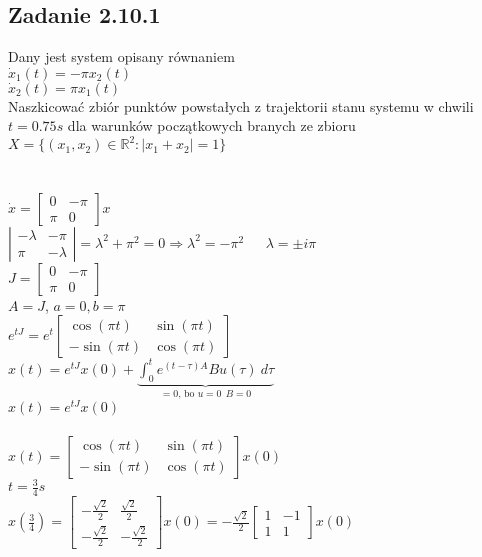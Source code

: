 \subsection*{Zadanie 2.10.1} {\color{darkgray}
	Dany jest system opisany równaniem\\
	$\dot{x}_1(t)=-\pi x_2(t)$\\
	$\dot{x}_2(t)=\pi x_1(t)$\\
	Naszkicować zbiór punktów powstałych z trajektorii stanu systemu w chwili $t=0.75s$ dla warunków początkowych branych ze zbioru $X=\{(x_1,x_2)\in \mathbb{R}^2:|x_1+x_2|=1\}$\\
}\lineh
\\\\
$\dot{x}=\left[\begin{array}{cc}0&-\pi\\\pi&0\end{array}\right]x$\\
$\left|\begin{array}{cc}-\lambda&-\pi\\\pi&-\lambda\end{array}\right|=\lambda^2+\pi^2=0\Rightarrow\lambda^2=-\pi^2 \ \ \ \ \ \ \ \lambda=\pm i\pi$\\
$J=\left[\begin{array}{cc}0&-\pi\\\pi&0\end{array}\right]$\\
$A = J$, $a=0, b=\pi$\\
$e^{tJ}=e^{t}\left[\begin{array}{cc}\cos(\pi t)&\sin(\pi t)\\-\sin(\pi t)&\cos(\pi t)\end{array}\right]$\\
$x(t)=e^{tJ}x(0)+\underbrace{\int_0^te^{(t-\tau)A}Bu(\tau)\ d\tau}_{=0 \text{, \ bo }u=0 \ \ B=0}$\\
$x(t)=e^{tJ}x(0)$\\\\
$x(t)=\left[\begin{array}{cc}\cos(\pi t)&\sin(\pi t)\\-\sin(\pi t)&\cos(\pi t)\end{array}\right]x(0)$\\
$t=\frac 34 s$\\
$x(\frac 34)=\left[\begin{array}{cc}-\frac{\sqrt{2}}{2}&\frac{\sqrt{2}}{2}\\-\frac{\sqrt{2}}{2}&-\frac{\sqrt{2}}{2}\end{array}\right]x(0)=-\frac{\sqrt{2}}{2}\left[\begin{array}{cc}1&-1\\1&1\end{array}\right]x(0)$\\
